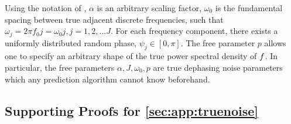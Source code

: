 Using the notation of \cite{soare2014}, $\alpha$ is an arbitrary scaling factor, $\omega_0$ is the fundamental spacing between true adjacent discrete frequencies, such that $\omega_j = 2 \pi f_0 j =\omega_0 j, j = 1, 2, ...J$. For each frequency component, there exists a uniformly distributed random phase, $\psi_j \in [0, \pi]$. The free parameter $p$ allows one to specify an arbitrary shape of the true power spectral density of $f$. In particular, the free parameters $\alpha, J, \omega_0, p$ are true dephasing noise parameters which any prediction algorithm cannot know beforehand.

\subsection{Supporting Proofs for \cref{sec:app:truenoise}}

